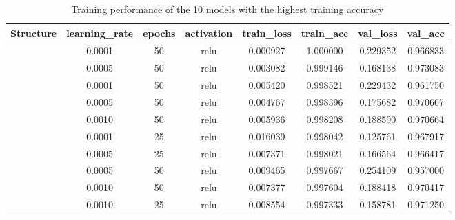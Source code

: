 \documentclass[a4paper]{article}
\begin{document}
\begin{table}[h!]
    \centering
    \caption{Training performance of the 10 models with the highest training accuracy}
    \label{tab:ann_performance_top10_training_accuracy}
    \begin{tabular}{|| c c c c | c c c c ||}
  
    \hline
    \centering
    \textbf{Structure}  &\textbf{learning\_rate} &\textbf{epochs}    &\textbf{activation}    & \textbf{train\_loss}   &\textbf{train\_acc} &\textbf{val\_loss}  &\textbf{val\_acc} \\
    \hline \hline
    [64,32]             & 0.0001                & 50                & relu                  & 0.000927              & 1.000000          &0.229352           & 0.966833 \\ 
    \hline
    [64,32,16]          & 0.0005                & 50                & relu                  & 0.003082              & 0.999146          &0.168138           & 0.973083 \\ 
    \hline
    [64,32,16]          & 0.0001                & 50                & relu                  & 0.005420              & 0.998521          &0.229432           & 0.961750 \\ 
    \hline
    [64,32]             & 0.0005                & 50                & relu                  & 0.004767              & 0.998396          &0.175682           & 0.970667 \\ 
    \hline
    [64,32]             & 0.0010                & 50                & relu                  & 0.005936              & 0.998208          &0.188590           & 0.970664 \\ 
    \hline
    [64,32]             & 0.0001                & 25                & relu                  & 0.016039              & 0.998042          &0.125761           & 0.967917 \\ 
    \hline
    [64,32]             & 0.0005                & 25                & relu                  & 0.007371              & 0.998021          &0.166564           & 0.966417 \\ 
    \hline
    [32,16]             & 0.0005                & 50                & relu                  & 0.009465              & 0.997667          &0.254109           & 0.957000 \\ 
    \hline
    [64,32,16]          & 0.0010                & 50                & relu                  & 0.007377              & 0.997604          &0.188418           & 0.970417 \\ 
    \hline
    [64,32]             & 0.0010                & 25                & relu                  & 0.008554              & 0.997333          &0.158781           & 0.971250 \\ 
    \hline
    \end{tabular}
\end{table}
\end{document}
